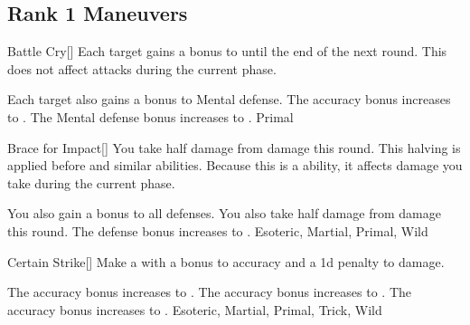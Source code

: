 \subsection{Rank 1 Maneuvers}

\lowercase{\hypertarget{maneuver:Battle Cry}{}}\label{maneuver:Battle Cry}
\hypertarget{maneuver:Battle Cry}{}
\begin{freeability}[Rank 1]{Battle Cry}[]
Each target gains a  bonus to  until the end of the next round.
This does not affect attacks during the current phase.

\rankline
{} Each target also gains a  bonus to Mental defense.
 The accuracy bonus increases to .
 The Mental defense bonus increases to .
 Primal
\end{freeability}
\vspace{0.25em}



\lowercase{\hypertarget{maneuver:Brace for Impact}{}}\label{maneuver:Brace for Impact}
\hypertarget{maneuver:Brace for Impact}{}
\begin{freeability}[Rank 1]{Brace for Impact}[]
You take half damage from  damage this round.
This halving is applied before  and similar abilities.
Because this is a  ability, it affects damage you take during the current phase.

\rankline
{} You also gain a  bonus to all defenses.
 You also take half damage from  damage this round.
 The defense bonus increases to .
 Esoteric, Martial, Primal, Wild
\end{freeability}
\vspace{0.25em}



\lowercase{\hypertarget{maneuver:Certain Strike}{}}\label{maneuver:Certain Strike}
\hypertarget{maneuver:Certain Strike}{}
\begin{freeability}[Rank 1]{Certain Strike}[]
Make a  with a  bonus to accuracy and a \minus1d penalty to damage.

\rankline
{} The accuracy bonus increases to .
 The accuracy bonus increases to .
 The accuracy bonus increases to .
 Esoteric, Martial, Primal, Trick, Wild
\end{freeability}
\vspace{0.25em}



